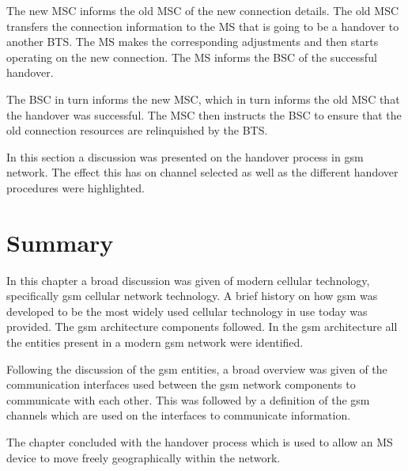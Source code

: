 \begin{description}
The new \gls{MSC} informs the old \gls{MSC} of the new connection details. The old \gls{MSC} transfers the connection information to the \gls{MS} that is going to be a handover to another \gls{BTS}\@\cite{wirelesstelcoMullet}. The \gls{MS} makes the corresponding adjustments and then starts operating on the new connection. The \gls{MS} informs the \gls{BSC} of the successful handover\cite{wirelesstelcoMullet,GSMArchitectureProtocolsServices}. 

  The \gls{BSC} in turn informs the new \gls{MSC}, which in turn informs the old \gls{MSC} that the handover was successful. The \gls{MSC} then instructs the \gls{BSC} to ensure that the old connection resources are relinquished by the \gls{BTS}.
\end{description}

In this section a discussion was presented on the handover process in \gls{gsm} network. The effect this has on channel selected as well as the different handover procedures were highlighted. 
\section{Summary}
In this chapter a broad discussion was given of modern cellular technology, specifically \gls{gsm} cellular network technology. A brief history on how \gls{gsm} was developed to be the most widely used cellular technology in use today was provided. The \gls{gsm} architecture components followed. In the \gls{gsm} architecture all the entities present in a modern \gls{gsm} network were identified.

Following the discussion of the \gls{gsm} entities, a broad overview was given of the communication interfaces used between the \gls{gsm} network components to communicate with each other. This was followed by a definition of the \gls{gsm} channels which are used on the interfaces to communicate information.

The chapter concluded with the handover process which is used to allow an \gls{MS} device to move freely geographically within the network. 
